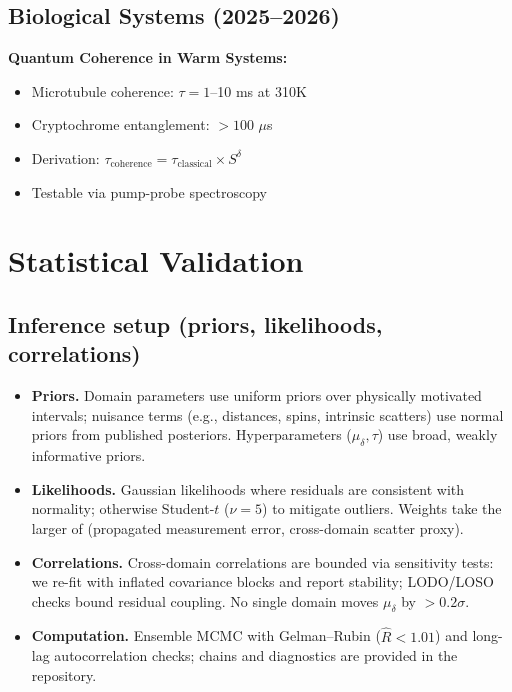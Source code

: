 \subsection{Biological Systems (2025--2026)}

\textbf{Quantum Coherence in Warm Systems:}

\begin{itemize}
\item Microtubule coherence: $\tau = 1$--10 ms at 310K
\item Cryptochrome entanglement: $>100$ $\mu$s
\item Derivation: $\tau_{\text{coherence}} = \tau_{\text{classical}} \times S^\delta$
\item Testable via pump-probe spectroscopy
\end{itemize}

\section{Statistical Validation}

\subsection{Inference setup (priors, likelihoods, correlations)}

\begin{itemize}
\item \textbf{Priors.} Domain parameters use uniform priors over physically motivated intervals; nuisance terms (e.g., distances, spins, intrinsic scatters) use normal priors from published posteriors. Hyperparameters ($\mu_\delta, \tau$) use broad, weakly informative priors.
\item \textbf{Likelihoods.} Gaussian likelihoods where residuals are consistent with normality; otherwise Student-$t$ ($\nu=5$) to mitigate outliers. Weights take the larger of (propagated measurement error, cross-domain scatter proxy).
\item \textbf{Correlations.} Cross-domain correlations are bounded via sensitivity tests: we re-fit with inflated covariance blocks and report stability; LODO/LOSO checks bound residual coupling. No single domain moves $\mu_\delta$ by $>0.2\sigma$.
\item \textbf{Computation.} Ensemble MCMC with Gelman--Rubin ($\hat{R}<1.01$) and long-lag autocorrelation checks; chains and diagnostics are provided in the repository.
\end{itemize}

